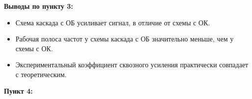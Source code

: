 \documentclass[a4paper,14pt]{extarticle}
\begin{document}
    \textbf{Выводы по пункту 3:}
    \vspace{-6ex}
    \begin{singlespace}
        \begin{itemize}
            \item Схема каскада с ОБ усиливает сигнал, в отличие от схемы с ОК.
            \item Рабочая полоса частот у схемы каскада с ОБ значительно меньше, чем у схемы с ОК.
            \item Экспериментальный коэффициент сквозного усиления практически совпадает с теоретическим.
        \end{itemize}
    \end{singlespace}


    \newpage
    \textbf{Пункт 4:}
    \vspace{-1cm}
\end{document}
